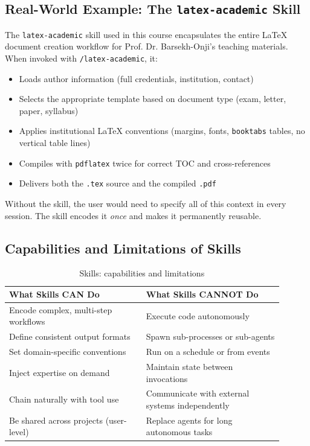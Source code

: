 \documentclass[11pt,letterpaper]{article}
\begin{document}
\subsection{Real-World Example: The \texttt{latex-academic} Skill}

The \texttt{latex-academic} skill used in this course encapsulates the entire LaTeX document creation workflow for Prof. Dr. Barsekh-Onji's teaching materials. When invoked with \texttt{/latex-academic}, it:

\begin{itemize}[leftmargin=*]
    \item Loads author information (full credentials, institution, contact)
    \item Selects the appropriate template based on document type (exam, letter, paper, syllabus)
    \item Applies institutional LaTeX conventions (margins, fonts, \texttt{booktabs} tables, no vertical table lines)
    \item Compiles with \texttt{pdflatex} twice for correct TOC and cross-references
    \item Delivers both the \texttt{.tex} source and the compiled \texttt{.pdf}
\end{itemize}

Without the skill, the user would need to specify all of this context in every session. The skill encodes it \emph{once} and makes it permanently reusable.

\subsection{Capabilities and Limitations of Skills}

\begin{table}[H]
\centering
\caption{Skills: capabilities and limitations}
\begin{tabular}{@{}p{0.45\linewidth}p{0.45\linewidth}@{}}
\toprule
\textbf{What Skills CAN Do} & \textbf{What Skills CANNOT Do} \\
\midrule
Encode complex, multi-step workflows & Execute code autonomously \\
Define consistent output formats & Spawn sub-processes or sub-agents \\
Set domain-specific conventions & Run on a schedule or from events \\
Inject expertise on demand & Maintain state between invocations \\
Chain naturally with tool use & Communicate with external systems independently \\
Be shared across projects (user-level) & Replace agents for long autonomous tasks \\
\bottomrule
\end{tabular}
\end{table}
\end{document}
